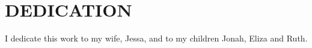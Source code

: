 \chapter*{DEDICATION}

I dedicate this work to my wife, Jessa, and to my children Jonah, Eliza and Ruth.

